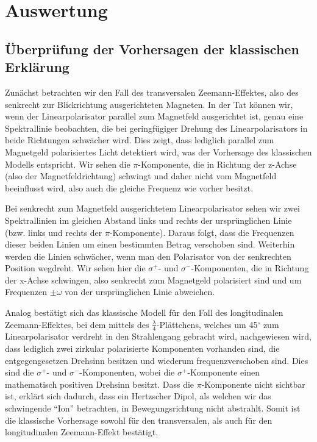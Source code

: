\chapter{Auswertung}
\section{Überprüfung der Vorhersagen der klassischen Erklärung}

Zunächst betrachten wir den Fall des transversalen Zeemann-Effektes, also des senkrecht zur Blickrichtung ausgerichteten Magneten. In der Tat können wir, wenn der Linearpolarisator parallel zum Magnetfeld ausgerichtet ist, genau eine Spektrallinie beobachten, die bei geringfügiger Drehung des Linearpolarisators in beide Richtungen schwächer wird. Dies zeigt, dass lediglich parallel zum Magnetgeld polarisiertes Licht detektiert wird, was der Vorhersage des klassischen Modells entspricht. Wir sehen die $\pi$-Komponente, die in Richtung der z-Achse (also der Magnetfeldrichtung) schwingt und daher nicht vom Magnetfeld beeinflusst wird, also auch die gleiche Frequenz wie vorher besitzt.

Bei senkrecht zum Magnetfeld ausgerichtetem Linearpolarisator sehen wir zwei Spektrallinien im gleichen Abstand links und rechts der ursprünglichen Linie (bzw. links und rechts der $\pi$-Komponente). Daraus folgt, dass die Frequenzen dieser beiden Linien um einen bestimmten Betrag verschoben sind. Weiterhin werden die Linien schwächer, wenn man den Polarisator von der senkrechten Position wegdreht. Wir sehen hier die $\sigma^+$- und $\sigma^-$-Komponenten, die in Richtung der x-Achse schwingen, also senkrecht zum Magnetgeld polarisiert sind und um Frequenzen $\pm \omega$ von der ursprünglichen Linie abweichen.

Analog bestätigt sich das klassische Modell für den Fall des longitudinalen Zeemann-Effektes, bei dem mittels des $\frac{\lambda}{4}$-Plättchens, welches um 45$^{\circ}$ zum Linearpolarisator verdreht in den Strahlengang gebracht wird, nachgewiesen wird, dass lediglich zwei zirkular polarisierte Komponenten vorhanden sind, die entgegengesetzen Drehsinn besitzen und wiederum frequenzverschoben sind. Dies sind die $\sigma^+$- und $\sigma^-$-Komponenten, wobei die $\sigma^+$-Komponente einen mathematisch positiven Drehsinn besitzt. Dass die $\pi$-Komponente nicht sichtbar ist, erklärt sich dadurch, dass ein Hertzscher Dipol, als welchen wir das schwingende "`Ion"' betrachten, in Bewegungsrichtung nicht abstrahlt. Somit ist die klassische Vorhersage sowohl für den transversalen, als auch für den longitudinalen Zeemann-Effekt bestätigt.

